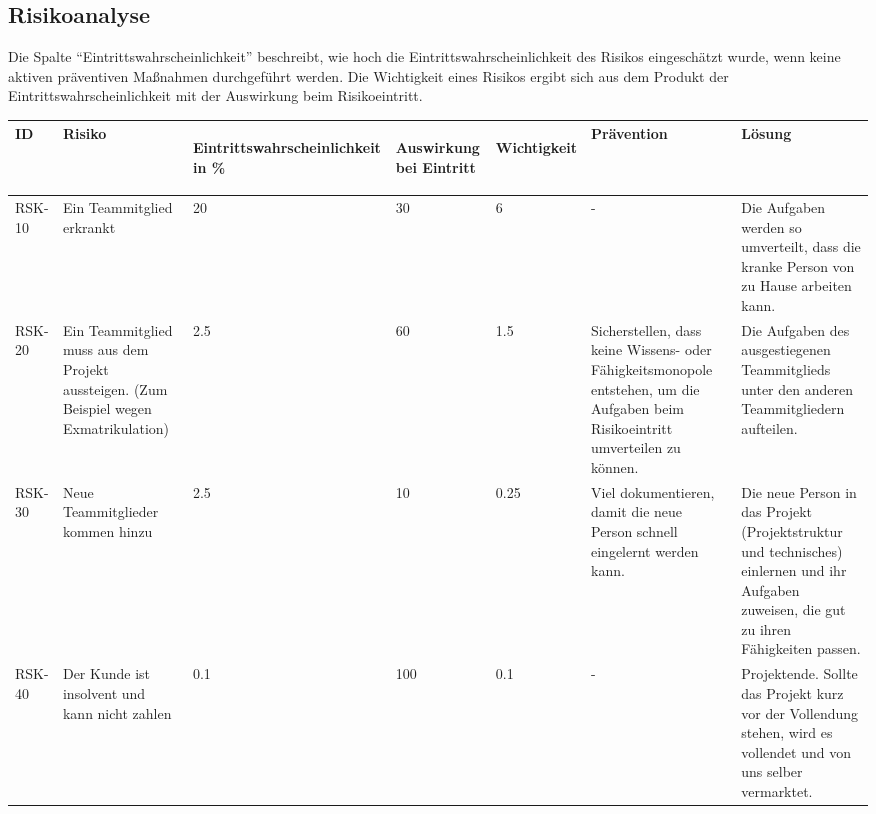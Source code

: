 \begin{landscape}
\chapter{Risikoanalyse}
	Die Spalte \enquote{Eintrittswahrscheinlichkeit} beschreibt, wie hoch die Eintrittswahrscheinlichkeit des Risikos eingeschätzt wurde, wenn keine aktiven präventiven Maßnahmen durchgeführt werden.
	Die Wichtigkeit eines Risikos ergibt sich aus dem Produkt der Eintrittswahrscheinlichkeit mit der Auswirkung beim Risikoeintritt.
	\begin{longtable}{|p{1.5cm}|p{4.5cm}|p{0.4cm}|p{0.4cm}|p{0.8cm}|p{4.5cm}|p{4.5cm}|}

		\hline
		\textbf{ID}
			& \textbf{Risiko} 
				& \begin{turn}{90}\textbf{Eintrittswahrscheinlichkeit in \%}\end{turn}
					& \begin{turn}{90}\textbf{Auswirkung bei Eintritt}\end{turn}
						& \begin{turn}{90}\textbf{Wichtigkeit}\end{turn} 
							& \textbf{Prävention} 
								& \textbf{Lösung} 
		\\ \hline

		
		RSK-10 	& Ein Teammitglied erkrankt
				& 20 	& 30 	& 6 	& - 	& Die Aufgaben werden so umverteilt, dass die kranke Person von zu Hause arbeiten kann. 

		\\ \hline

		RSK-20 	& Ein Teammitglied muss aus dem Projekt aussteigen. (Zum Beispiel wegen Exmatrikulation)
				& 2.5 	& 60 	& 1.5 	& Sicherstellen, dass keine Wissens- oder Fähigkeitsmonopole entstehen, um die Aufgaben beim Risikoeintritt umverteilen zu können.
								& Die Aufgaben des ausgestiegenen Teammitglieds unter den anderen Teammitgliedern aufteilen.

		\\ \hline

		RSK-30 	& Neue Teammitglieder kommen hinzu
				& 2.5 	& 10 	& 0.25 	& Viel dokumentieren, damit die neue Person schnell eingelernt werden kann.
								& Die neue Person in das Projekt (Projektstruktur und technisches) einlernen und ihr Aufgaben zuweisen, die gut zu ihren Fähigkeiten passen.

		\\ \hline

		RSK-40 	& Der Kunde ist insolvent und kann nicht zahlen
				& 0.1 	& 100 	& 0.1 	& - 	& Projektende. Sollte das Projekt kurz vor der Vollendung stehen, wird es vollendet und von uns selber vermarktet.


\end{longtable}
\end{landscape}
